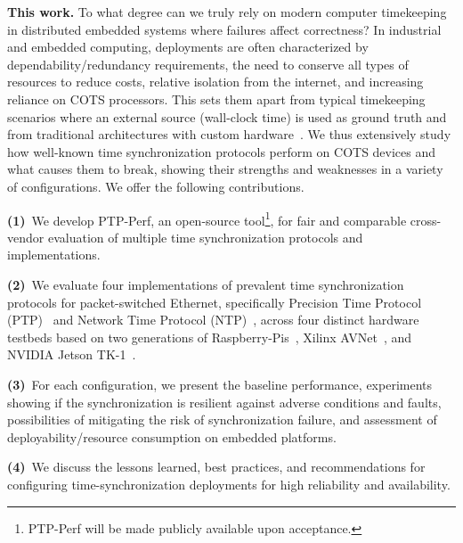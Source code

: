 \textbf{This work.}
To what degree can we truly rely on modern computer timekeeping in distributed embedded systems where failures affect correctness?
In industrial and embedded computing,
deployments are often characterized by dependability/redundancy requirements,
the need to conserve all types of resources to reduce costs,
relative isolation from the internet, %
and increasing reliance on COTS processors.
This sets them apart from typical timekeeping scenarios where an external source
(wall-clock time) is used as ground truth
and from traditional architectures with custom hardware~\cite{wensley1978sift,hopkins1978ftmp}.
We thus extensively study how well-known time synchronization protocols perform on COTS devices and what causes them to break,
showing their strengths and weaknesses in a variety of configurations.
We offer the following contributions.

\textbf{(1)}~We develop PTP-Perf, an open-source tool\footnote{PTP-Perf will be made publicly available upon acceptance.}, for fair and comparable cross-vendor evaluation of multiple time synchronization protocols and implementations.

\textbf{(2)}~We evaluate %
four implementations of prevalent time synchronization protocols for packet-switched Ethernet,
specifically Precision Time Protocol (PTP)~\cite{ptp-spec} and Network Time Protocol (NTP)~\cite{ntpv4-spec},
across four distinct hardware testbeds
based on two generations of Raspberry-Pis~\cite{??, ??},
Xilinx AVNet~\cite{??}, and NVIDIA Jetson TK-1~\cite{??}.

\textbf{(3)}~For each configuration,
we present the baseline performance, %
experiments showing if the synchronization is resilient against adverse
conditions and faults,
possibilities of mitigating the risk of synchronization failure,
and assessment of deployability/resource consumption on embedded platforms.

\textbf{(4)}~We discuss the lessons learned, best practices, and recommendations
for configuring time-synchronization deployments for high reliability and availability.


